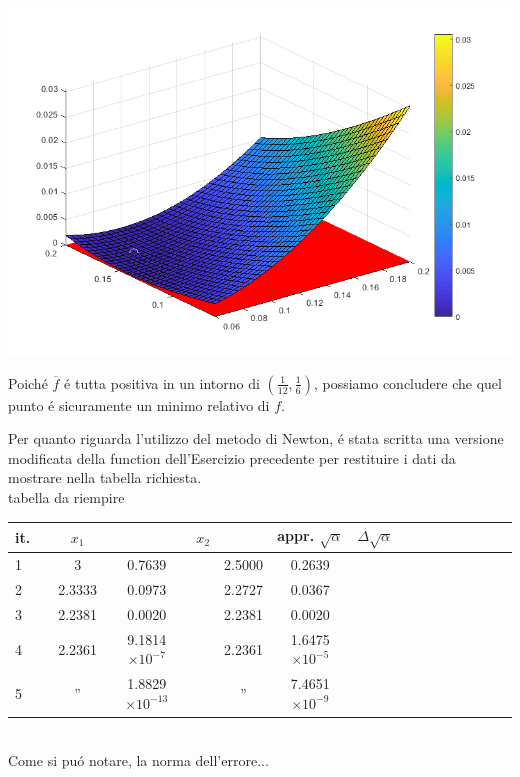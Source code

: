 \begin{center}
	\includegraphics[scale=0.7]{cap3/3_11_sign.png}
\end{center}

\noindent Poich\'e \(\overline{f}\) \'e tutta positiva in un intorno di \((\frac{1}{12}, \frac{1}{6})\), possiamo concludere che quel punto \'e sicuramente un minimo relativo di \(f\).

\noindent Per quanto riguarda l'utilizzo del metodo di Newton, \'e stata scritta una versione modificata della function dell'Esercizio precedente per restituire i dati da mostrare nella tabella richiesta.
\\


tabella da riempire
\begin{tabular}{l*{15}{c}}
 it. & \vline& \(x_1\) &\vline& \(x_2\) & \vline& appr. \(\sqrt\alpha \) & \(\Delta\sqrt\alpha \) \\
\hline
 1 & \vline& 3      & 0.7639				& \vline& 2.5000 & 0.2639 \\
 2 & \vline& 2.3333 & 0.0973				& \vline& 2.2727 & 0.0367 \\
 3 & \vline& 2.2381 & 0.0020				& \vline& 2.2381 & 0.0020 \\
 4 & \vline& 2.2361 & 9.1814 \(\times10^{-7}\) 	& \vline& 2.2361 & 1.6475 \(\times10^{-5}\) \\
 5 & \vline& ''     & 1.8829 \(\times10^{-13}\)	& \vline& ''     & 7.4651 \(\times10^{-9}\) \\

\end{tabular} \\

%
%
%
%
%

\noindent Come si pu\'o notare, la norma dell'errore...

